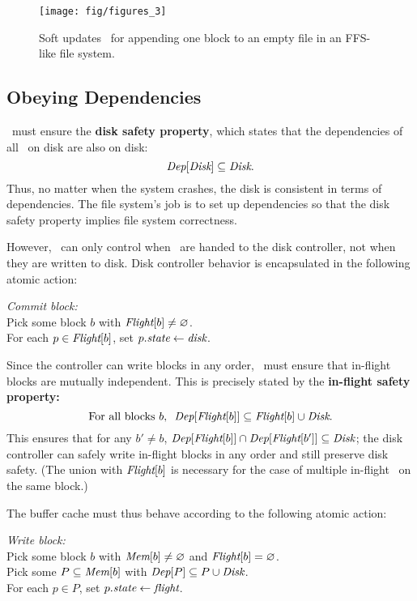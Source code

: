 \begin{figure}[htb]
  \centering
  \texttt{[image: fig/figures\_3]}
  \caption{\label{fig:softupdate} Soft updates \patches\
  for appending one block to an empty file in an FFS-like file system.}
\end{figure}


\subsection{Obeying Dependencies}
\label{sec:patch:dependencies}

\Kudos\ must ensure the \textbf{disk safety property}, which states that
 the dependencies of all \patches\ on disk are also on disk:
%
\[ \PDepset{\PDisk} \subseteq \PDisk. \]
%
Thus, no matter when the system crashes, the disk is consistent in terms of
dependencies.
%
The file system's job is to set up dependencies so that the disk safety
property implies file system correctness.

However, \Kudos\ can only control when \patches\ are handed to the disk
 controller, not when they are written to disk.
%
Disk controller behavior is encapsulated in the following atomic action:

\begin{tabbing}
\textit{Commit block:} \\
\quad Pick some block $b$ with $\PInf[b] \neq \emptyset$. \\
\quad For each $p \in \PInf[b]$, set $p.\textit{state} \gets \textit{disk}$.
\end{tabbing}

\noindent
%
Since the controller can write blocks in any order, \Kudos\ must ensure
that in-flight blocks are mutually independent.  This is precisely stated
by the \textbf{in-flight safety property:}
%
\[ \text{For all blocks $b$,~~} \PDepset{\PInf[b]} \subseteq \PInf[b] \cup \PDisk . \]
%
This ensures that for any $b' \neq b$, $\PDepset{\PInf[b]} \cap
 \PDepset{\PInf[b']} \subseteq \PDisk$; the disk controller can safely
 write in-flight blocks in any order and still preserve disk safety.
%
(The union with $\PInf[b]$ is necessary for the case of multiple in-flight
\patches\ on the same block.)


The buffer cache must thus behave according to the following atomic action:

\begin{tabbing}
\textit{Write block:} \\
\quad Pick some block $b$ with $\PMem[b] \neq \emptyset$ and $\PInf[b] =
\emptyset$. \\
\quad Pick some $P \subseteq \PMem[b]$ with $\PDepset{P} \subseteq P \cup
\PDisk$. \\
\quad For each $p \in P$, set $p.\textit{state} \gets \textit{flight}$.
\end{tabbing}


